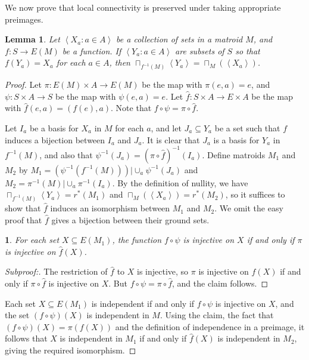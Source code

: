 \documentclass{amsart}
\theoremstyle{plain}
\newtheorem{claim}{}[theorem]
\newtheorem{lemma}[theorem]{Lemma}
\theoremstyle{definition}
\newcommand{\wh}{\widehat}
\newcommand{\ab}[1]{\left\langle#1\right\rangle}
\renewcommand{\ss}{\subseteq}
\newenvironment{subproof}[1][\proofname]{%
  \renewcommand{\qedsymbol}{$\blacksquare$}%
  \begin{proof}[Subproof:]%
}{%
  \end{proof}%
}
\begin{document}
We now prove that local connectivity is preserved under taking appropriate preimages.

\begin{lemma}\label{lcpreimage}
  Let $\ab{X_a : a \in A}$ be a collection of sets in a matroid $M$, 
  and $f : S \to E(M)$ be a function. If $\ab{Y_a : a \in A}$ are subsets of $S$
  so that $f(Y_a) = X_a$ for each $a \in A$, then $\sqcap_{f^{-1}(M)}\ab{Y_a} = \sqcap_M(\ab{X_a})$. 
\end{lemma}
\begin{proof}
  Let $\pi : E(M) \times A \to E(M)$ 
  be the map with $\pi(e,a) = e$, and $\psi : S \times A \to S$ be the map with $\psi(e,a) = e$.
  Let $\hat{f} : S \times A \to E \times A$ be the map with $\hat{f}(e,a) = (f(e),a)$. 
  Note that $f \circ \psi = \pi \circ \wh{f}$. 

  Let $I_a$ be a basis for $X_a$ in $M$ for each $a$, and let $J_a \ss Y_a$ be a set such that $f$ induces 
  a bijection between $I_a$ and $J_a$. It is clear that $J_a$ is a basis for $Y_a$ in $f^{-1}(M)$, 
  and also that $\psi^{-1}(J_a) = (\pi \circ \wh{f})^{-1}(I_a)$.
  Define matroids $M_1$ and $M_2$ by  
  $M_1 = (\psi^{-1} (f^{-1}(M))) | \cup_a \psi^{-1}(J_a)$ and $M_2 = \pi^{-1}(M) | \cup_a \pi^{-1}(I_a)$. 
  By the definition of nullity, we have $\sqcap_{f^{-1}(M)} \ab{Y_a} = r^*(M_1)$ and $\sqcap_M(\ab{X_a}) = r^*(M_2)$, 
  so it suffices to show that $\hat{f}$ induces an isomorphism between $M_1$ and $M_2$. 
  We omit the easy proof that $\hat{f}$ gives a bijection between their ground sets. 
  \begin{claim}
    For each set $X \ss E(M_1)$, the function $f \circ \psi$ is injective on $X$ if and only if $\pi$ is injective on $\hat{f}(X)$. 
  \end{claim}
  \begin{subproof}
    The restriction of $\wh{f}$ to $X$ is injective, so $\pi$ is injective on $\hat{f}(X)$ if and only if
    $\pi \circ \hat{f}$ is injective on $X$. But $f \circ \psi = \pi \circ \hat{f}$, and the claim follows. 
  \end{subproof}
  Each set $X \ss E(M_1)$ is independent if and only if $f \circ \psi$ is injective on $X$,
  and the set $(f \circ \psi)(X)$ is independent in $M$. Using the claim, the fact that $(f \circ \psi)(X) = \pi(f(X))$ 
  and the definition of independence in a preimage, it follows that $X$ is independent in $M_1$ if and only if $\hat{f}(X)$ 
  is independent in $M_2$, giving the required isomorphism. 
\end{proof}
\end{document}
